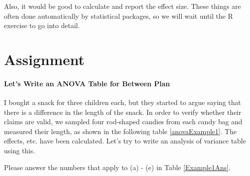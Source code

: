 \documentclass{ltjbook}
\begin{document}
Also, it would be good to calculate and report the effect size. These things are often done automatically by statistical packages, so we will wait until the R exercise to go into detail.
\section{Assignment}

\paragraph{Let's Write an ANOVA Table for Between Plan} I bought a snack for three children each, but they started to argue saying that there is a difference in the length of the snack.
In order to verify whether their claims are valid, we sampled four rod-shaped candies from each candy bag and measured their length, as shown in the following table \ref{anovaExample1}.
The effects, etc. have been calculated. Let's try to write an analysis of variance table using this.



Please answer the numbers that apply to (a) - (e) in Table \ref{Example1Ans}.


\end{document}
